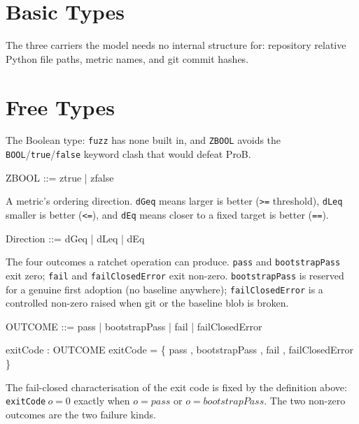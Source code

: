 \documentclass[a4paper,10pt,fleqn]{article}
\begin{document}
\section{Basic Types}

The three carriers the model needs no internal structure for: repository
relative Python file paths, metric names, and git commit hashes.

\begin{zed}
\end{zed}

\section{Free Types}

The Boolean type: \texttt{fuzz} has none built in, and \texttt{ZBOOL}
avoids the \texttt{BOOL}/\texttt{true}/\texttt{false} keyword clash that
would defeat ProB.

\begin{zed}
ZBOOL ::= ztrue | zfalse
\end{zed}

A metric's ordering direction. \texttt{dGeq} means larger is better
(\texttt{>=} threshold), \texttt{dLeq} smaller is better (\texttt{<=}),
and \texttt{dEq} means closer to a fixed target is better (\texttt{==}).

\begin{zed}
Direction ::= dGeq | dLeq | dEq
\end{zed}

The four outcomes a ratchet operation can produce. \texttt{pass} and
\texttt{bootstrapPass} exit zero; \texttt{fail} and \texttt{failClosedError}
exit non-zero. \texttt{bootstrapPass} is reserved for a genuine first
adoption (no baseline anywhere); \texttt{failClosedError} is a controlled
non-zero raised when git or the baseline blob is broken.

\begin{zed}
OUTCOME ::= pass | bootstrapPass | fail | failClosedError
\end{zed}

\begin{axdef}
exitCode : OUTCOME \fun \nat
\where
exitCode = \{ pass , bootstrapPass ,
fail , failClosedError  \}
\end{axdef}

The fail-closed characterisation of the exit code is fixed by the
definition above: \texttt{exitCode}$~o = 0$ exactly when $o = pass$ or
$o = bootstrapPass$. The two non-zero outcomes are the two failure kinds.
\end{document}
